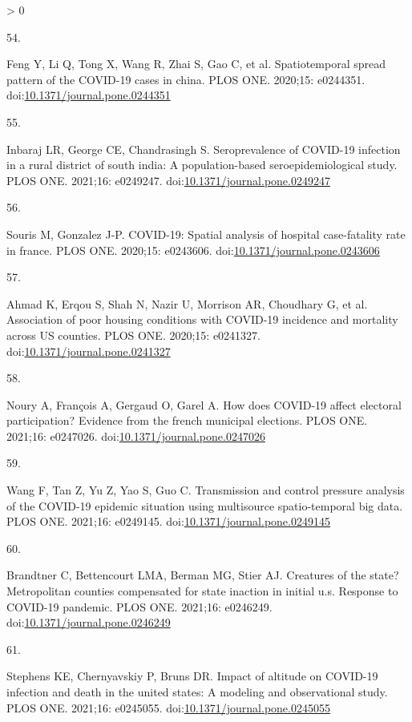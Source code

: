 \documentclass[10pt,letterpaper]{article}
\newlength{\csllabelwidth}
\newlength{\cslhangindent}
\newenvironment{CSLReferences}[3] %
 {%
  \setlength{\parindent}{0pt}
  \ifodd #1 \everypar{\setlength{\hangindent}{\cslhangindent}}\ignorespaces\fi
  \ifnum #2 > 0
  \setlength{\parskip}{#2\baselineskip}
  \fi
 }%
 {}
\newcommand{\CSLLeftMargin}[1]{\parbox[t]{\csllabelwidth}{#1}}
\newcommand{\CSLRightInline}[1]{\parbox[t]{\linewidth - \csllabelwidth}{#1}}
\begin{document}
\begin{CSLReferences}{0}{0}
\leavevmode\hypertarget{ref-Feng2020spread}{}%
\CSLLeftMargin{54. }
\CSLRightInline{Feng Y, Li Q, Tong X, Wang R, Zhai S, Gao C, et al.
Spatiotemporal spread pattern of the COVID-19 cases in china. PLOS ONE.
2020;15: e0244351.
doi:\href{https://doi.org/10.1371/journal.pone.0244351}{10.1371/journal.pone.0244351}}

\leavevmode\hypertarget{ref-Inbaraj2021seroprevalence}{}%
\CSLLeftMargin{55. }
\CSLRightInline{Inbaraj LR, George CE, Chandrasingh S. Seroprevalence of
COVID-19 infection in a rural district of south india: A
population-based seroepidemiological study. PLOS ONE. 2021;16: e0249247.
doi:\href{https://doi.org/10.1371/journal.pone.0249247}{10.1371/journal.pone.0249247}}

\leavevmode\hypertarget{ref-Souris2020covid}{}%
\CSLLeftMargin{56. }
\CSLRightInline{Souris M, Gonzalez J-P. COVID-19: Spatial analysis of
hospital case-fatality rate in france. PLOS ONE. 2020;15: e0243606.
doi:\href{https://doi.org/10.1371/journal.pone.0243606}{10.1371/journal.pone.0243606}}

\leavevmode\hypertarget{ref-Ahmad2020association}{}%
\CSLLeftMargin{57. }
\CSLRightInline{Ahmad K, Erqou S, Shah N, Nazir U, Morrison AR,
Choudhary G, et al. Association of poor housing conditions with COVID-19
incidence and mortality across US counties. PLOS ONE. 2020;15: e0241327.
doi:\href{https://doi.org/10.1371/journal.pone.0241327}{10.1371/journal.pone.0241327}}

\leavevmode\hypertarget{ref-Noury2021how}{}%
\CSLLeftMargin{58. }
\CSLRightInline{Noury A, François A, Gergaud O, Garel A. How does
COVID-19 affect electoral participation? Evidence from the french
municipal elections. PLOS ONE. 2021;16: e0247026.
doi:\href{https://doi.org/10.1371/journal.pone.0247026}{10.1371/journal.pone.0247026}}

\leavevmode\hypertarget{ref-Wang2021transmission}{}%
\CSLLeftMargin{59. }
\CSLRightInline{Wang F, Tan Z, Yu Z, Yao S, Guo C. Transmission and
control pressure analysis of the COVID-19 epidemic situation using
multisource spatio-temporal big data. PLOS ONE. 2021;16: e0249145.
doi:\href{https://doi.org/10.1371/journal.pone.0249145}{10.1371/journal.pone.0249145}}

\leavevmode\hypertarget{ref-Brandtner2021creatures}{}%
\CSLLeftMargin{60. }
\CSLRightInline{Brandtner C, Bettencourt LMA, Berman MG, Stier AJ.
Creatures of the state? Metropolitan counties compensated for state
inaction in initial u.s. Response to COVID-19 pandemic. PLOS ONE.
2021;16: e0246249.
doi:\href{https://doi.org/10.1371/journal.pone.0246249}{10.1371/journal.pone.0246249}}

\leavevmode\hypertarget{ref-Stephens2021impact}{}%
\CSLLeftMargin{61. }
\CSLRightInline{Stephens KE, Chernyavskiy P, Bruns DR. Impact of
altitude on COVID-19 infection and death in the united states: A
modeling and observational study. PLOS ONE. 2021;16: e0245055.
doi:\href{https://doi.org/10.1371/journal.pone.0245055}{10.1371/journal.pone.0245055}}

\end{CSLReferences}

\nolinenumbers
\end{document}
